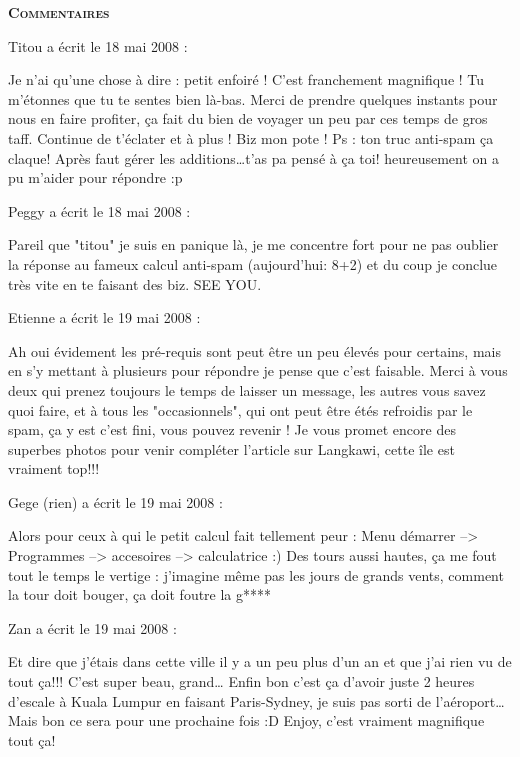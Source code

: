 \bigskip
\textbf{\textsc{Commentaires}}

\medskip
Titou a écrit le 18 mai 2008 :
\begin{displayquote}
Je n'ai qu'une chose à dire : petit enfoiré ! C'est franchement magnifique ! Tu m'étonnes que tu te sentes bien là-bas. Merci de prendre quelques instants pour nous en faire profiter, ça fait du bien de voyager un peu par ces temps de gros taff. Continue de t'éclater et à plus ! Biz mon pote !
Ps : ton truc anti-spam ça claque! Après faut gérer les additions\dots t'as pa pensé à ça toi! heureusement on a pu m'aider pour répondre :p
\end{displayquote}

\medskip
Peggy a écrit le 18 mai 2008 :
\begin{displayquote}
Pareil que "titou" je suis en panique là, je me concentre fort pour ne pas oublier la réponse au fameux calcul anti-spam (aujourd'hui: 8+2) et du coup je conclue très vite en te faisant des biz.
SEE YOU.
\end{displayquote}

\medskip
Etienne a écrit le 19 mai 2008 :
\begin{displayquote}
Ah oui évidement les pré-requis sont peut être un peu élevés pour certains, mais en s'y mettant à plusieurs pour répondre je pense que c'est faisable.
Merci à vous deux qui prenez toujours le temps de laisser un message, les autres vous savez quoi faire, et à tous les "occasionnels", qui ont peut être étés refroidis par le spam, ça y est c'est fini, vous pouvez revenir !
Je vous promet encore des superbes photos pour venir compléter l'article sur Langkawi, cette île est vraiment top!!!
\end{displayquote}

\medskip
Gege (rien) a écrit le 19 mai 2008 :
\begin{displayquote}
Alors pour ceux à qui le petit calcul fait tellement peur : Menu démarrer --> Programmes --> accesoires --> calculatrice :)
Des tours aussi hautes, ça me fout tout le temps le vertige : j'imagine même pas les jours de grands vents, comment la tour doit bouger, ça doit foutre la g****
\end{displayquote}

\medskip
Zan a écrit le 19 mai 2008 :
\begin{displayquote}
Et dire que j'étais dans cette ville il y a un peu plus d'un an et que j'ai rien vu de tout ça!!! C'est super beau, grand\dots
Enfin bon c'est ça d'avoir juste 2 heures d'escale à Kuala Lumpur en faisant Paris-Sydney, je suis pas sorti de l'aéroport\dots Mais bon ce sera pour une prochaine fois :D
Enjoy, c'est vraiment magnifique tout ça!
\end{displayquote}

\vfill
